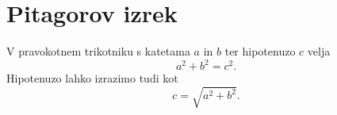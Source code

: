 \documentclass{article}
\begin{document}
\section*{Pitagorov izrek}
V pravokotnem trikotniku s katetama \(a\) in \(b\) ter hipotenuzo \(c\) velja
\[ a^2 + b^2 = c^2.\]
Hipotenuzo lahko izrazimo tudi kot 
\[c = \sqrt{a^2 + b^2}.\]
\end{document}
